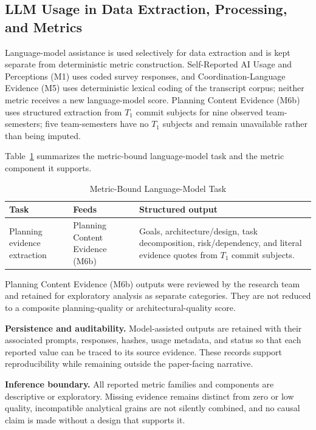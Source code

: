 
\subsection{LLM Usage in Data Extraction, Processing, and Metrics}
Language-model assistance is used selectively for data extraction and is kept
separate from deterministic metric construction. Self-Reported AI Usage and
Perceptions (M1) uses coded survey responses, and Coordination-Language Evidence
(M5) uses deterministic lexical coding of the transcript corpus; neither metric
receives a new language-model score. Planning Content Evidence (M6b) uses structured extraction from
$T_1$ commit subjects for nine observed team-semesters; five team-semesters have
no $T_1$ subjects and remain unavailable rather than being imputed.

Table~\ref{tab:llm_prompt_catalog} summarizes the metric-bound language-model
task and the metric component it supports.

\begin{table}[t]
\caption{Metric-Bound Language-Model Task}
\label{tab:llm_prompt_catalog}
\centering
\small
\begin{tabular}{@{}>{\raggedright\arraybackslash}p{1.7cm}>{\raggedright\arraybackslash}p{1.7cm}>{\raggedright\arraybackslash}p{3.7cm}@{}}
\toprule
\textbf{Task} & \textbf{Feeds} & \textbf{Structured output} \\
\midrule
Planning evidence extraction & Planning Content Evidence (M6b) & Goals, architecture/design, task decomposition, risk/dependency, and literal evidence quotes from $T_1$ commit subjects. \\
\bottomrule
\end{tabular}
\end{table}

Planning Content Evidence (M6b) outputs were reviewed by the research team and retained for exploratory
analysis as separate categories. They are not reduced to a composite
planning-quality or architectural-quality score.

\textbf{Persistence and auditability.} Model-assisted outputs are retained with
their associated prompts, responses, hashes, usage metadata, and status so that
each reported value can be traced to its source evidence. These records support
reproducibility while remaining outside the paper-facing narrative.

\textbf{Inference boundary.} All reported metric families and components are
descriptive or exploratory. Missing evidence remains distinct from zero or
low quality, incompatible analytical grains are not silently combined, and no
causal claim is made without a design that supports it.
